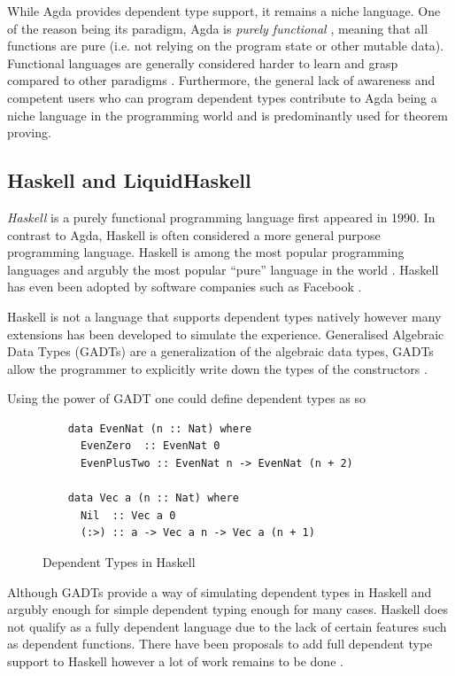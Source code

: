 \documentclass[a4paper,12pt]{report}
\begin{document}
\par
While Agda provides dependent type support, it remains a niche language. One of 
the reason being its paradigm, Agda is \textit{purely functional} \cite{purelyFP}, meaning that 
all functions are pure (i.e. not relying on the program state or other mutable 
data). Functional languages are generally considered harder to learn and grasp 
compared to other paradigms \cite{fpHarder}. Furthermore, the general lack of 
awareness and competent users who can program dependent types contribute to Agda 
being a niche language in the programming world and is 
predominantly used for theorem proving.

\subsection{Haskell and LiquidHaskell}
\textit{Haskell} \cite{haskell} is a purely functional programming language first appeared in 1990. In 
contrast to Agda, Haskell is often considered a more general purpose programming 
language. Haskell is among the most popular programming languages and argubly 
the most popular ``pure'' language in the world \cite{pypl}. 
Haskell has even been adopted by software companies such as Facebook \cite{haskellFB}.

\par
Haskell is not a language that supports dependent types natively however many 
extensions has been developed to simulate the experience. 
Generalised Algebraic Data Types (GADTs) are a generalization of the 
algebraic data types, GADTs allow the programmer to 
explicitly write down the types of the constructors \cite{haskellGADT}. 

\par
Using the power of GADT one could define dependent types as so

\begin{figure}[H]
  \begin{lstlisting}      
    data EvenNat (n :: Nat) where
      EvenZero  :: EvenNat 0
      EvenPlusTwo :: EvenNat n -> EvenNat (n + 2)
      
    data Vec a (n :: Nat) where
      Nil  :: Vec a 0
      (:>) :: a -> Vec a n -> Vec a (n + 1)
  \end{lstlisting}
  \caption{Dependent Types in Haskell}
\end{figure}

\par
Although GADTs provide a way of simulating dependent types in Haskell and 
argubly enough for simple dependent typing enough for many cases. 
Haskell does not qualify as a fully dependent 
language due to the lack of certain features such as dependent functions. There 
have been proposals to add full dependent type support to Haskell however a lot 
of work remains to be done \cite{dependentHaskell, aRoleForDependentHaskell}. 
\end{document}
